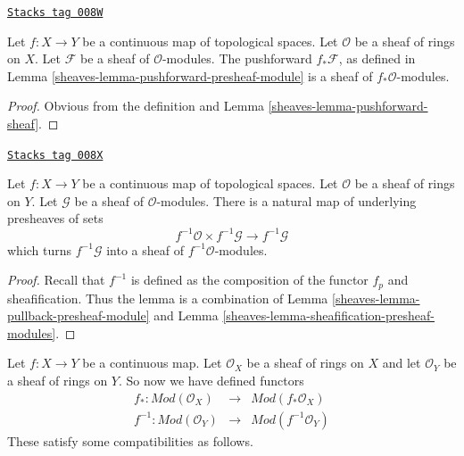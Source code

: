 \begin{lemma}
\label{sheaves-lemma-pushforward-module}
\href{https://stacks.math.columbia.edu/tag/008W}{\texttt{Stacks tag 008W}}

Let $f : X \to Y$ be a continuous map of topological spaces.
Let $\mathcal{O}$ be a sheaf of rings on $X$. Let
$\mathcal{F}$ be a sheaf of $\mathcal{O}$-modules.
The pushforward $f_*\mathcal{F}$, as defined in
Lemma \ref{sheaves-lemma-pushforward-presheaf-module}
is a sheaf of $f_*\mathcal{O}$-modules.
\end{lemma}

\begin{proof}

Obvious from the definition and Lemma \ref{sheaves-lemma-pushforward-sheaf}.
\end{proof}

\begin{lemma}
\label{sheaves-lemma-pullback-module}
\href{https://stacks.math.columbia.edu/tag/008X}{\texttt{Stacks tag 008X}}

Let $f : X \to Y$ be a continuous map of topological spaces.
Let $\mathcal{O}$ be a sheaf of rings on $Y$. Let
$\mathcal{G}$ be a sheaf of $\mathcal{O}$-modules.
There is a natural map of underlying presheaves of sets
$$
f^{-1}\mathcal{O} \times f^{-1}\mathcal{G}
\longrightarrow
f^{-1}\mathcal{G}
$$
which turns $f^{-1}\mathcal{G}$ into a
sheaf of $f^{-1}\mathcal{O}$-modules.
\end{lemma}

\begin{proof}

Recall that $f^{-1}$ is defined as the composition of the
functor $f_p$ and sheafification. Thus the lemma
is a combination of Lemma \ref{sheaves-lemma-pullback-presheaf-module}
and Lemma \ref{sheaves-lemma-sheafification-presheaf-modules}.
\end{proof}

Let $f : X \to Y$ be a continuous map.
Let $\mathcal{O}_X$ be a sheaf of rings on $X$ and
let $\mathcal{O}_Y$ be a sheaf of rings on $Y$.
So now we have defined functors
\begin{eqnarray*}
f_* : \textit{Mod}(\mathcal{O}_X) &
\longrightarrow &
\textit{Mod}(f_*\mathcal{O}_X) \\
f^{-1} : \textit{Mod}(\mathcal{O}_Y) &
\longrightarrow &
\textit{Mod}(f^{-1}\mathcal{O}_Y)
\end{eqnarray*}
These satisfy some compatibilities as follows.

